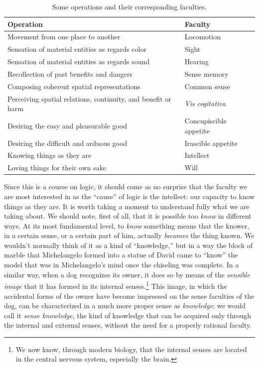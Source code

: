\documentclass[article,12pt,a4paper,oneside]{memoir}
\begin{document}
    \begin{table}[ht]
    \begin{center}
    \caption{Some operations and their corresponding faculties.}
    \label{tab:table2}
    \begin{tabular}{l|l}
    \toprule
    Operation & Faculty \\
    \midrule
    Movement from one place to another & Locomotion \\
    Sensation of material entities as regards color & Sight \\
    Sensation of material entities as regards sound & Hearing \\
    Recollection of past benefits and dangers & Sense memory \\
    Composing coherent spatial representations & Common sense \\
    Perceiving spatial relations, continuity, and benefit or harm & \emph{Vis cogitativa} \\
    Desiring the easy and pleasurable good & Concupiscible appetite \\
    Desiring the difficult and arduous good & Irascible appetite \\
    Knowing things as they are & Intellect \\
    Loving things for their own sake & Will \\
    \bottomrule
    \end{tabular}
    \end{center}
    \end{table}

    Since this is a course on logic, it should come as no surprise that
    the faculty we are most interested in as the ``cause'' of logic is
    the intellect: our capacity to know things as they are. It is worth
    taking a moment to understand fully what we are taking about. We
    should note, first of all, that it is possible too \emph{know} in
    different ways. At its most fundamental level, to \emph{know}
    something means that the knower, in a certain sense, or a certain
    part of him, actually \emph{becomes} the thing known. We wouldn't
    normally think of it as a kind of ``knowledge,'' but in a way the
    block of marble that Michelangelo formed into a statue of David came
    to ``know'' the model that was in Michelangelo's mind once the
    chiseling was complete. In a similar way, when a dog recognizes its
    owner, it does so by means of the \emph{sensible image} that it has
    formed in its internal senses.\footnote{We now know, through modern
      biology, that the internal senses are located in the central
      nervous system, especially the brain.} This image, in which the
    accidental forms of the owner have become impressed on the sense
    faculties of the dog, can be characterized in a much more proper
    sense as \emph{knowledge}: we would call it \emph{sense knowledge},
    the kind of knowledge that can be acquired only through the internal
    and external senses, without the need for a properly rational
    faculty.
\end{document}
